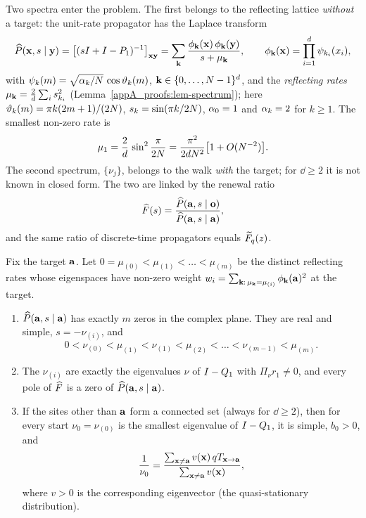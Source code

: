 Two spectra enter the problem. The first belongs to the reflecting lattice \emph{without} a target: the unit-rate
propagator has the Laplace transform \citep{Giuggioli2020}
\begin{equation}\label{s2_model:eq-prop}
  \widehat{P}(\mathbf{x},s\mid\mathbf{y})=\bigl[(sI+I-P_1)^{-1}\bigr]_{\mathbf{x}\mathbf{y}}=\sum_{\mathbf{k}}\frac{\phi_{\mathbf{k}}(\mathbf{x})\,\phi_{\mathbf{k}}(\mathbf{y})}{s+\mu_{\mathbf{k}}},
  \qquad \phi_{\mathbf{k}}(\mathbf{x})=\prod_{i=1}^{d}\psi_{k_i}(x_i),
\end{equation}
with $\psi_{k}(m)=\sqrt{\alpha_{k}/N}\,\cos\vartheta_{k}(m)$, $\mathbf{k}\in\{0,\dots,N-1\}^{d}$, and the \emph{reflecting rates}
$\mu_{\mathbf{k}}=\frac{2}{d}\sum_is_{k_i}^{2}$ (Lemma~\ref{appA_proofs:lem-spectrum}); here $\vartheta_{k}(m)=\pi k(2m+1)/(2N)$,
$s_{k}=\sin(\pi k/2N)$, $\alpha_{0}=1$ and $\alpha_{k}=2$ for $k\ge1$. The smallest non-zero rate is
\begin{equation}\label{s2_model:eq-mu1}
  \mu_{1}=\frac{2}{d}\,\sin^{2}\frac{\pi}{2N}=\frac{\pi^{2}}{2d N^{2}}\bigl[1+O(N^{-2})\bigr].
\end{equation}
The second spectrum, $\{\nu_j\}$, belongs to the walk \emph{with} the target; for $\dd\ge2$ it is not known in closed
form. The two are linked by the renewal ratio \citep{MontrollWeiss1965,Redner2001}
\begin{equation}\label{s2_model:eq-renewal}
  \widehat{F}(s)=\frac{\widehat{P}(\mathbf{a},s\mid\mathbf{o})}{\widehat{P}(\mathbf{a},s\mid\mathbf{a})} ,
\end{equation}
and the same ratio of discrete-time propagators equals $\widetilde{F}_q(z)$.

\begin{proposition}\label{s2_model:prop-interlacing}
Fix the target $\mathbf{a}$. Let $0=\mu_{(0)}<\mu_{(1)}<\dots<\mu_{(m)}$ be the distinct reflecting rates whose eigenspaces
have non-zero weight $w_i=\sum_{\mathbf{k}:\,\mu_{\mathbf{k}}=\mu_{(i)}}\phi_{\mathbf{k}}(\mathbf{a})^{2}$ at the target.
\begin{enumerate}
\item[(i)] $\widehat{P}(\mathbf{a},s\mid\mathbf{a})$ has exactly $m$ zeros in the complex plane. They are real and simple,
$s=-\nu_{(i)}$, and
\begin{equation}\label{s2_model:eq-interlace}
  0<\nu_{(0)}<\mu_{(1)}<\nu_{(1)}<\mu_{(2)}<\dots<\nu_{(m-1)}<\mu_{(m)} .
\end{equation}
\item[(ii)] The $\nu_{(i)}$ are exactly the eigenvalues $\nu$ of $I-Q_1$ with $\Pi_\nu r_1\neq0$, and every pole of
$\widehat{F}$ is a zero of $\widehat{P}(\mathbf{a},s\mid\mathbf{a})$.
\item[(iii)] If the sites other than $\mathbf{a}$ form a connected set (always for $\dd\ge2$), then for every start
$\nu_0=\nu_{(0)}$ is the smallest eigenvalue of $I-Q_1$, it is simple, $b_0>0$, and
\begin{equation}\label{s2_model:eq-qsd}
  \frac{1}{\nu_{0}}=\frac{\sum_{\mathbf{x}\neq\mathbf{a}}v(\mathbf{x})\,qT_{\mathbf{x}\to\mathbf{a}}}{\sum_{\mathbf{x}\neq\mathbf{a}}v(\mathbf{x})},
\end{equation}
where $v>0$ is the corresponding eigenvector (the quasi-stationary distribution).
\end{enumerate}
\end{proposition}

